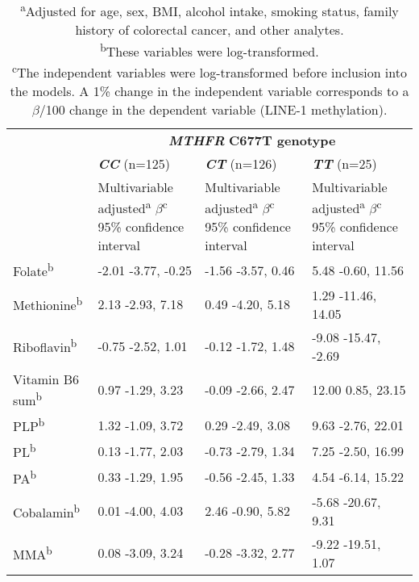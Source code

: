 \begin{table}
\small
\caption{Associations between plasma B vitamins and LINE-1 methylation according to \emph{MTHFR} C677T genotype.}
\label{table5_4}
\begin{adjustbox}{width=\textwidth}
\begin{tabular}{L{2.3cm}C{3.7cm}C{3.7cm}C{3.5cm}}

\hline ~ & \\ ~ & \textbf{\textit{CC}} (n=125) & \textbf{\textit{CT}} (n=126) & \textbf{\textit{TT}} (n=25)\\
~ & { Multivariable adjusted\textsuperscript{a}}{ $\beta $\textsuperscript{c}}
95\% confidence interval & { Multivariable adjusted\textsuperscript{a}}{ $\beta $\textsuperscript{c}}
95\% confidence interval & { Multivariable adjusted\textsuperscript{a}}{ $\beta $\textsuperscript{c}}
95\% confidence interval\\
\hline
 Folate\textsuperscript{b} & { {}-2.01} {}-3.77, -0.25 & { {}-1.56} {}-3.57, 0.46 & { 5.48} {}-0.60, 11.56\\
 Methionine\textsuperscript{b} & { 2.13} {}-2.93, 7.18 & { 0.49} {}-4.20, 5.18 & { 1.29} {}-11.46, 14.05\\
 Riboflavin\textsuperscript{b} & { {}-0.75} {}-2.52, 1.01 & { {}-0.12} {}-1.72, 1.48 & { {}-9.08} {}-15.47, -2.69\\
 Vitamin B6 sum\textsuperscript{b} & { 0.97} {}-1.29, 3.23 & { {}-0.09} {}-2.66, 2.47 & { 12.00} 0.85, 23.15\\
 PLP\textsuperscript{b} & { 1.32} {}-1.09, 3.72 & { 0.29} {}-2.49, 3.08 & { 9.63} {}-2.76, 22.01\\
 PL\textsuperscript{b} & { 0.13} {}-1.77, 2.03 & { {}-0.73} {}-2.79, 1.34 & { 7.25} {}-2.50, 16.99\\
 PA\textsuperscript{b} & { 0.33} {}-1.29, 1.95 & { {}-0.56} {}-2.45, 1.33 & { 4.54} {}-6.14, 15.22\\
 Cobalamin\textsuperscript{b} & { 0.01} {}-4.00, 4.03 & { 2.46} {}-0.90, 5.82 & { {}-5.68} {}-20.67, 9.31\\
 MMA\textsuperscript{b} & { 0.08} {}-3.09, 3.24 & { {}-0.28} {}-3.32, 2.77 & { {}-9.22} {}-19.51, 1.07\\
\hline
\end{tabular}
\end{adjustbox}
\caption*{\footnotesize{\textsuperscript{a}Adjusted for age, sex, BMI, alcohol intake, smoking status, family history of colorectal cancer, and other analytes.\\\textsuperscript{b}These variables were log-transformed.\\\textsuperscript{c}The independent variables were log-transformed before inclusion into the models. A 1\% change in the independent variable corresponds to a $\beta$/100 change in the dependent variable (LINE-1 methylation).}}
\end{table}

